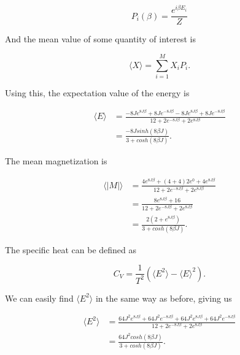 \documentclass[%
oneside,                 %
final,                   %
10pt]{article}
\begin{document}
\begin{equation*}
P_i(\beta)= \frac{e^{i \beta E_i}}{Z}
\end{equation*}

And the mean value of some quantity of interest is 

\begin{equation*}
\langle X \rangle = \sum_{i=1}^M X_i P_i.
\end{equation*}

Using this, the expectation value of the energy is 

\begin{equation*}
\begin{split}
\langle E \rangle & = \frac{-8J e^{8 J \beta}+8J e^{-8 J \beta} -8J e^{8 J \beta} + 8J e^{-8 J \beta}}{12+2e^{-8 J \beta} + 2e^{8 J \beta}} \\
& = \frac{-8 J sinh(8 \beta J)}{3 + cosh(8 \beta J)}.
\end{split}
\end{equation*}

The mean magnetization is

\begin{equation*}
\begin{split}
\langle |M| \rangle & = \frac{4 e^{8 J \beta}+(4+4)2 e^{0} + 4 e^{8 J \beta} }{12+2e^{-8 J \beta} + 2e^{8 J \beta}} \\
& = \frac{8e^{8 J \beta}+16}{12+2e^{-8 J \beta} + 2e^{8 J \beta}} \\
& = \frac{2(2+e^{8 J \beta})}{3 + cosh(8 \beta J)}.
\end{split}
\end{equation*}

The specific heat can be defined as 

\begin{equation*}
C_V=\frac{1}{T^2} (\langle E^2 \rangle - \langle E \rangle ^2).
\end{equation*}

We can easily find $\langle E^2 \rangle$ in the same way as before, giving us

\begin{equation*}
\begin{split}
\langle E^2 \rangle & = \frac{64J^2 e^{8 J \beta}+64J^2 e^{-8 J \beta} +64J^2 e^{8 J \beta} + 64J^2 e^{-8 J \beta}}{12+2e^{-8 J \beta} + 2e^{8 J \beta}} \\
& = \frac{64 J^2 cosh(8 \beta J)}{3 + cosh(8 \beta J)}.
\end{split}
\end{equation*}
\end{document}
